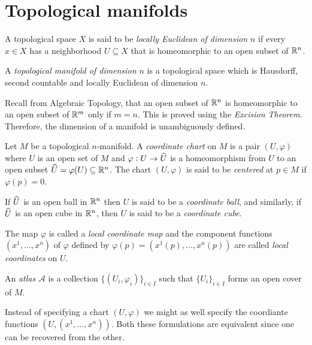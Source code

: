 \section{Topological manifolds}

\begin{definition}
    A topological space $X$ is said to be \emph{locally Euclidean of dimension $n$} if every $x\in X$ has a neighborhood $U\subseteq X$ that is homeomorphic to an open subset of $\mathbb{R}^n$.
\end{definition}

\begin{definition}[Manifold]
    A \emph{topological manifold of dimension $n$} is a topological space which is Hausdorff, second countable and locally Euclidean of dimension $n$.
\end{definition}

\begin{remark}
    Recall from Algebraic Topology, that an open subset of $\mathbb{R}^n$ is homeomorphic to an open subset of $\mathbb{R}^m$ only if $m = n$. This is proved using the \emph{Excision Theorem}. Therefore, the dimension of a manifold is unambiguously defined.
\end{remark}

\begin{definition}[Chart]
    Let $M$ be a topological $n$-manifold. A \emph{coordinate chart} on $M$ is a pair $(U,\varphi)$ where $U$ is an open set of $M$ and $\varphi: U\to\widehat{U}$ is a homeomorphism from $U$ to an open subset $\widehat{U} = \varphi(U)\subseteq\mathbb{R}^n$. The chart $(U,\varphi)$ is said to be \emph{centered} at $p\in M$ if $\varphi(p) = 0$.

    If $\widehat{U}$ is an open ball in $\mathbb{R}^n$ then $U$ is said to be a \emph{coordinate ball}, and similarly, if $\widehat{U}$ is an open cube in $\mathbb{R}^n$, then $U$ is said to be a \emph{coordinate cube}.

    The map $\varphi$ is called a \emph{local coordinate map} and the component functions $(x^1,\dots,x^n)$ of $\varphi$ defined by $\varphi(p) = (x^1(p),\dots,x^n(p))$ are called \emph{local coordinates} on $U$.

    An \emph{atlas} $\mathscr A$ is a collection $\{(U_i,\varphi_i)\}_{i\in I}$ such that $\{U_i\}_{i\in I}$ forms an open cover of $M$.
\end{definition}

\begin{remark}
    Instead of specifying a chart $(U,\varphi)$ we might as well specify the coordiante functions $(U,(x^1,\dots,x^n))$. Both these formulations are equivalent since one can be recovered from the other.
\end{remark}

